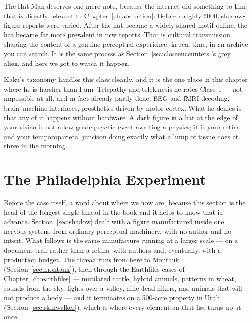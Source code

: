 \begin{funfact}
The Hat Man deserves one more note, because the internet did something to him that is directly
relevant to Chapter~\ref{ch:abduction}. Before roughly 2000, shadow-figure reports were varied. After the hat
became a widely shared motif online, the hat became far more prevalent in new reports. That is
cultural transmission shaping the content of a genuine perceptual experience, in real time, in
an archive you can search. It is the same process as Section~\ref{sec:closeencounters}'s grey alien, and here we got to
watch it happen.
\end{funfact}

Kaku's taxonomy handles this class cleanly, and it is the one place in this chapter where he is
harsher than I am. Telepathy and telekinesis he rates Class~I --- not impossible at all, and in
fact already partly done: EEG and fMRI decoding, brain--machine interfaces, prosthetics driven by
motor cortex. What he denies is that any of it happens without hardware. A dark figure in a hat
at the edge of your vision is not a low-grade psychic event awaiting a physics; it is your retina
and your temporoparietal junction doing exactly what a lump of tissue does at three in the
morning. 

\section{The Philadelphia Experiment}\label{sec:philadelphiaexperiment}

Before the case itself, a word about where we now are, because this section is the head of the
longest single thread in the book and it helps to know that in advance.
Section~\ref{sec:shadow} dealt with a figure manufactured inside one nervous system, from
ordinary perceptual machinery, with no author and no intent. What follows is the same
manufacture running at a larger scale --- on a document trail rather than a retina, with authors
and, eventually, with a production budget. The thread runs from here to Montauk
(Section~\ref{sec:montauk}), then through the Earthfiles cases of Chapter~\ref{ch:earthfiles} ---
mutilated cattle, hybrid animals, patterns in wheat, sounds from the sky, lights over a valley,
nine dead hikers, and animals that will not produce a body --- and it terminates on a
500-acre property in Utah (Section~\ref{sec:skinwalker}), which is where every element on that
list turns up at once. 

